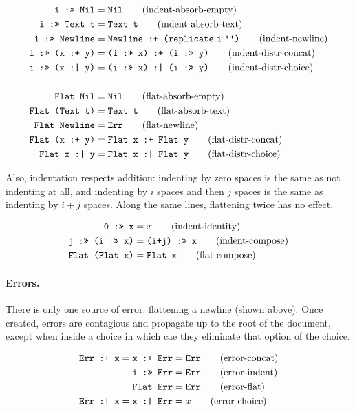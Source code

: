 \documentclass{article}
\newcommand{\ind}[2]{\texttt{#1 :>> #2}}
\newcommand{\cat}[2]{\texttt{#1 :+ #2}}
\newcommand{\choice}[2]{\texttt{#1 :| #2}}
\newcommand{\txt}[1]{\texttt{Text #1}}
\newcommand{\nil}{\texttt{Nil}}
\newcommand{\err}{\texttt{Err}}
\newcommand{\nl}{\texttt{Newline}}
\renewcommand{\flat}[1]{\texttt{Flat #1}}
\newcommand{\spaces}[1]{\texttt{replicate}\;#1\;\texttt{\textquotesingle \textquotesingle}}
\begin{document}
\begin{align*}
  \ind{i}{\nil} &= \nil
    \tag{indent-absorb-empty} \\
  \ind{i}{\txt{t}} &= \txt{t}
    \tag{indent-absorb-text} \\
  \ind{i}{\nl}  &= \cat{\nl}{(\spaces{i})}
    \tag{indent-newline} \\
  \ind{i}{(\cat{x}{y})} &= \cat{(\ind{i}{x})}{(\ind{i}{y})}
    \tag{indent-distr-concat} \\
  \ind{i}{(\choice{x}{y})} &= \choice{(\ind{i}{x})}{(\ind{i}{y})}
    \tag{indent-distr-choice} \\
  \\
  \flat{\nil} &= \nil
    \tag{flat-absorb-empty} \\
  \flat{(\txt{t})} &= \txt{t}
    \tag{flat-absorb-text} \\
  \flat{\nl} &= \err
    \tag{flat-newline} \\
  \flat{(\cat{x}{y})} &= \cat{\flat{x}}{\flat{y}}
    \tag{flat-distr-concat} \\
  \flat{\choice{x}{y}} &= \choice{\flat{x}}{\flat{y}}
    \tag{flat-distr-choice}
\end{align*}

Also, indentation respects addition: indenting by zero spaces is the same as not indenting at all,
and indenting by $i$ spaces and then $j$ spaces is the same as indenting by $i+j$ spaces. Along the
same lines, flattening twice has no effect.

\begin{align*}
  \ind{0}{x} &= x
    \tag{indent-identity} \\
  \ind{j}{(\ind{i}{x})} &= \ind{(i+j)}{x}
    \tag{indent-compose} \\
  \flat{(\flat{x})} &= \flat{x}
    \tag{flat-compose}
\end{align*}

\paragraph{Errors.}
There is only one source of error: flattening a newline (shown above). Once created, errors are
contagious and propagate up to the root of the document, except when inside a choice in which cae
they eliminate that option of the choice.

\begin{align*}
  \cat{\err}{x} = \cat{x}{\err} &= \err
    \tag{error-concat} \\
  \ind{i}{\err} &= \err
    \tag{error-indent} \\
  \flat{\err} &= \err
    \tag{error-flat} \\
  \choice{\err}{x} = \choice{x}{\err} &= x
    \tag{error-choice}
\end{align*}
\end{document}
